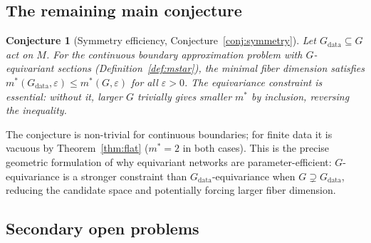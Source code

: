 \documentclass[11pt, a4paper]{article}
\theoremstyle{plain}
\newtheorem*{conjecture*}{Conjecture}
\theoremstyle{definition}
\begin{document}
\subsection{The remaining main conjecture}

\begin{conjecture*}[Symmetry efficiency, Conjecture~\ref{conj:symmetry}]
Let $G_{\mathrm{data}} \subseteq G$ act on $M$. For the continuous boundary
approximation problem with $G$-\emph{equivariant} sections (Definition~\ref{def:mstar}),
the minimal fiber dimension satisfies $m^*(G_{\mathrm{data}},\varepsilon) \leq
m^*(G,\varepsilon)$ for all $\varepsilon > 0$. The equivariance constraint is
essential: without it, larger $G$ trivially gives smaller $m^*$ by inclusion,
reversing the inequality.
\end{conjecture*}

\noindent The conjecture is non-trivial for continuous boundaries; for finite
data it is vacuous by Theorem~\ref{thm:flat} ($m^* = 2$ in both cases).
This is the precise geometric formulation of why equivariant networks are
parameter-efficient: $G$-equivariance is a stronger constraint than
$G_{\mathrm{data}}$-equivariance when $G \supsetneq G_{\mathrm{data}}$,
reducing the candidate space and potentially forcing larger fiber dimension.

\subsection{Secondary open problems}
\end{document}
